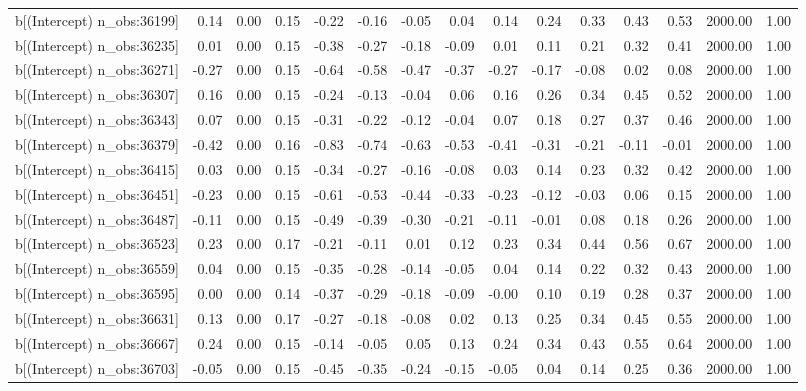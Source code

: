 \begin{table}[ht]
\begin{tabular}{rrrrrrrrrrrrrrr}
  b[(Intercept) n\_obs:36199] & 0.14 & 0.00 & 0.15 & -0.22 & -0.16 & -0.05 & 0.04 & 0.14 & 0.24 & 0.33 & 0.43 & 0.53 & 2000.00 & 1.00 \\ 
  b[(Intercept) n\_obs:36235] & 0.01 & 0.00 & 0.15 & -0.38 & -0.27 & -0.18 & -0.09 & 0.01 & 0.11 & 0.21 & 0.32 & 0.41 & 2000.00 & 1.00 \\ 
  b[(Intercept) n\_obs:36271] & -0.27 & 0.00 & 0.15 & -0.64 & -0.58 & -0.47 & -0.37 & -0.27 & -0.17 & -0.08 & 0.02 & 0.08 & 2000.00 & 1.00 \\ 
  b[(Intercept) n\_obs:36307] & 0.16 & 0.00 & 0.15 & -0.24 & -0.13 & -0.04 & 0.06 & 0.16 & 0.26 & 0.34 & 0.45 & 0.52 & 2000.00 & 1.00 \\ 
  b[(Intercept) n\_obs:36343] & 0.07 & 0.00 & 0.15 & -0.31 & -0.22 & -0.12 & -0.04 & 0.07 & 0.18 & 0.27 & 0.37 & 0.46 & 2000.00 & 1.00 \\ 
  b[(Intercept) n\_obs:36379] & -0.42 & 0.00 & 0.16 & -0.83 & -0.74 & -0.63 & -0.53 & -0.41 & -0.31 & -0.21 & -0.11 & -0.01 & 2000.00 & 1.00 \\ 
  b[(Intercept) n\_obs:36415] & 0.03 & 0.00 & 0.15 & -0.34 & -0.27 & -0.16 & -0.08 & 0.03 & 0.14 & 0.23 & 0.32 & 0.42 & 2000.00 & 1.00 \\ 
  b[(Intercept) n\_obs:36451] & -0.23 & 0.00 & 0.15 & -0.61 & -0.53 & -0.44 & -0.33 & -0.23 & -0.12 & -0.03 & 0.06 & 0.15 & 2000.00 & 1.00 \\ 
  b[(Intercept) n\_obs:36487] & -0.11 & 0.00 & 0.15 & -0.49 & -0.39 & -0.30 & -0.21 & -0.11 & -0.01 & 0.08 & 0.18 & 0.26 & 2000.00 & 1.00 \\ 
  b[(Intercept) n\_obs:36523] & 0.23 & 0.00 & 0.17 & -0.21 & -0.11 & 0.01 & 0.12 & 0.23 & 0.34 & 0.44 & 0.56 & 0.67 & 2000.00 & 1.00 \\ 
  b[(Intercept) n\_obs:36559] & 0.04 & 0.00 & 0.15 & -0.35 & -0.28 & -0.14 & -0.05 & 0.04 & 0.14 & 0.22 & 0.32 & 0.43 & 2000.00 & 1.00 \\ 
  b[(Intercept) n\_obs:36595] & 0.00 & 0.00 & 0.14 & -0.37 & -0.29 & -0.18 & -0.09 & -0.00 & 0.10 & 0.19 & 0.28 & 0.37 & 2000.00 & 1.00 \\ 
  b[(Intercept) n\_obs:36631] & 0.13 & 0.00 & 0.17 & -0.27 & -0.18 & -0.08 & 0.02 & 0.13 & 0.25 & 0.34 & 0.45 & 0.55 & 2000.00 & 1.00 \\ 
  b[(Intercept) n\_obs:36667] & 0.24 & 0.00 & 0.15 & -0.14 & -0.05 & 0.05 & 0.13 & 0.24 & 0.34 & 0.43 & 0.55 & 0.64 & 2000.00 & 1.00 \\ 
  b[(Intercept) n\_obs:36703] & -0.05 & 0.00 & 0.15 & -0.45 & -0.35 & -0.24 & -0.15 & -0.05 & 0.04 & 0.14 & 0.25 & 0.36 & 2000.00 & 1.00 \\ 

\end{tabular}
\end{table}
